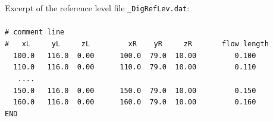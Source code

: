 \label{txt:sectionFile}
Excerpt of the reference level file \texttt{\_DigRefLev.dat}: \label{txt:E4RefLevFile}
\\
\\ \hspace*{3mm} \texttt{\scriptsize{\#  comment line                                            }}
\\ \hspace*{3mm} \texttt{\scriptsize{\#~~~xL~~~~~yL~~~~~zL~~~~~~~~~xR~~~~yR~~~~~zR~~~~~~~flow length}}
\\ \hspace*{3mm} \texttt{\scriptsize{~~100.0~~~116.0~~0.00~~~~~~100.0~~79.0~~10.00~~~~~~~~~0.100 }}
\\ \hspace*{3mm} \texttt{\scriptsize{~~110.0~~~116.0~~0.00~~~~~~110.0~~79.0~~10.00~~~~~~~~~0.110 }}
\\ \hspace*{3mm} \texttt{\scriptsize{~~  ....                                                    }}
\\ \hspace*{3mm} \texttt{\scriptsize{~~150.0~~~116.0~~0.00~~~~~~150.0~~79.0~~10.00~~~~~~~~~0.150 }}
\\ \hspace*{3mm} \texttt{\scriptsize{~~160.0~~~116.0~~0.00~~~~~~160.0~~79.0~~10.00~~~~~~~~~0.160 }}
\\ \hspace*{3mm} \texttt{\scriptsize{END                                                         }}



\newpage
